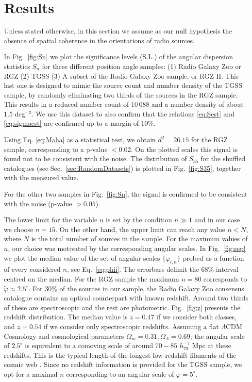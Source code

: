\section{Results}
	\label{sec:RES}
 
	Unless stated otherwise, in this section we assume as our null hypothesis the absence of spatial coherence in the orientations of radio sources. 
 
	In Fig.~\ref{fig:Sn} we plot the significance levels (S.L.) of the angular dispersion statistics $S_n$ for three different position angle samples: (1) Radio Galaxy Zoo or RGZ (2) TGSS (3) A subset of the Radio Galaxy Zoo sample, or RGZ II. This last one is designed to mimic the source count and number density of the TGSS sample, by randomly eliminating two thirds of the sources in the RGZ sample. This results in a reduced number count of $10\,088$ and a number density of about $1.5$ deg$^{-2}$. We use this dataset to also confirm that the relations \eqref{eq:Sest} and \eqref{eq:sigmaest} are confirmed up to a margin of $10\%$.
	
	Using Eq. \eqref{eq:Maha} as a statistical test, we obtain $d^2 = 26.15$ for the RGZ sample, corresponding to a p-value $< 0.02$. On the plotted scales this signal is found not to be consistent with the noise. The distribution of $S_{35}$ for the shuffled catalogues (see Sec.~\ref{sec:RandomDatasets}) is plotted in Fig.~\ref{fig:S35}, together with the measured value.
	
	For the other two samples in Fig.~\ref{fig:Sn}, the signal is confirmed to be consistent with the noise (p-value $> 0.05$).
	
	The lower limit for the variable $n$ is set by the condition $n \gg 1$ and in our case we choose $n=15$. On the other hand, the upper limit can reach any value $n < N$, where $N$ is the total number of sources in the sample. For the maximum values of $n$, our choice was motivated by the corresponding angular scales. In Fig.~\ref{fig:sep} we plot the median value of the set of angular scales $\{\varphi_{i, n}\}$ probed as a function of every considered $n$, see Eq.~\eqref{eq:phii}. The errorbars delimit the $68\%$ interval centred on the median. For the RGZ sample the maximum $n=80$ corresponds to $\tilde{\varphi} \approx 2.5^\circ$. For $30\%$ of the sources in our sample, the Radio Galaxy Zoo consensus catalogue contains an optical counterpart with known redshift. Around two thirds of these are spectroscopic and the rest are photometric. Fig.~\ref{fig:z} presents the redshift distribution. The median value is $z = 0.47$ if we consider both classes, and $z = 0.54$ if we consider only spectroscopic redshifts. Assuming a flat $\Lambda$CDM Cosmology and cosmological parameters $\Omega_m=0.31, \Omega_\Lambda = 0.69$; the angular scale of $2.5^\circ$ is equivalent to a comoving scale of around $70-85$ $h_{70}^{-1}$ Mpc at these redshifts. This is the typical length of the longest low-redshift filaments of the cosmic web \citep{Tempel2014}. Since no redshift information is provided for the TGSS sample, we opt for a maximal $n$ corresponding to an angular scale of $\varphi = 5^\circ$.
	
